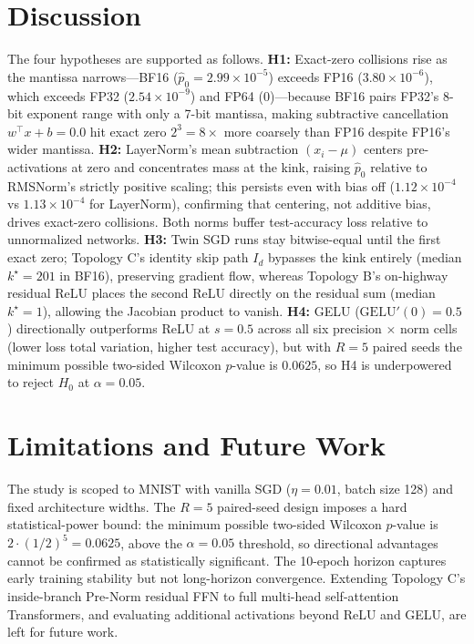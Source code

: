 \documentclass[11pt]{article}
\begin{document}
\section{Discussion}\label{sec:discussion}
The four hypotheses are supported as follows. \textbf{H1:} Exact-zero collisions rise as the mantissa narrows---BF16 ($\hat p_0=2.99\times10^{-5}$) exceeds FP16 ($3.80\times10^{-6}$), which exceeds FP32 ($2.54\times10^{-9}$) and FP64 ($0$)---because BF16 pairs FP32's 8-bit exponent range with only a 7-bit mantissa, making subtractive cancellation $w^\top x+b=\mathtt{0.0}$ hit exact zero $2^3=8\times$ more coarsely than FP16 despite FP16's wider mantissa. \textbf{H2:} LayerNorm's mean subtraction $(x_i-\mu)$ centers pre-activations at zero and concentrates mass at the kink, raising $\hat p_0$ relative to RMSNorm's strictly positive scaling; this persists even with bias off ($1.12\times10^{-4}$ vs $1.13\times10^{-4}$ for LayerNorm), confirming that centering, not additive bias, drives exact-zero collisions. Both norms buffer test-accuracy loss relative to unnormalized networks. \textbf{H3:} Twin SGD runs stay bitwise-equal until the first exact zero; Topology C's identity skip path $I_d$ bypasses the kink entirely (median $k^\star=201$ in BF16), preserving gradient flow, whereas Topology B's on-highway residual ReLU places the second ReLU directly on the residual sum (median $k^\star=1$), allowing the Jacobian product to vanish. \textbf{H4:} GELU ($\mathrm{GELU}'(0)=0.5$) directionally outperforms ReLU at $s=0.5$ across all six precision $\times$ norm cells (lower loss total variation, higher test accuracy), but with $R=5$ paired seeds the minimum possible two-sided Wilcoxon $p$-value is $0.0625$, so H4 is underpowered to reject $H_0$ at $\alpha=0.05$.

\section{Limitations and Future Work}\label{sec:limitations}
The study is scoped to MNIST with vanilla SGD ($\eta=0.01$, batch size 128) and fixed architecture widths. The $R=5$ paired-seed design imposes a hard statistical-power bound: the minimum possible two-sided Wilcoxon $p$-value is $2\cdot(1/2)^5=0.0625$, above the $\alpha=0.05$ threshold, so directional advantages cannot be confirmed as statistically significant. The 10-epoch horizon captures early training stability but not long-horizon convergence. Extending Topology C's inside-branch Pre-Norm residual FFN to full multi-head self-attention Transformers, and evaluating additional activations beyond ReLU and GELU, are left for future work.
\end{document}
